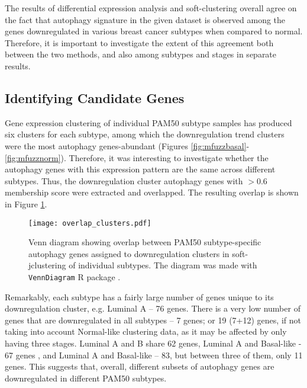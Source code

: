 The results of differential expression analysis and soft-clustering overall agree on the fact that autophagy signature in the given dataset is observed among the genes downregulated in various breast cancer subtypes when compared to normal. Therefore, it is important to investigate the extent of this agreement both between the two methods, and also among subtypes and stages in separate results. 



\subsection{Identifying Candidate Genes}

Gene expression clustering of individual PAM50 subtype samples has produced six clusters for each subtype, among which the downregulation trend clusters were the most autophagy genes-abundant (Figures \ref{fig:mfuzzbasal}-\ref{fig:mfuzznorm}). Therefore, it was interesting to investigate whether the autophagy genes with this expression pattern are the same across different subtypes. Thus, the downregulation cluster autophagy genes with $>0.6$ membership score were extracted and overlapped. The resulting overlap is shown in Figure \ref{fig:overlapclusters}. \\

            \begin{figure}[!h]
            \centering
            \texttt{[image: overlap\_clusters.pdf]} 
            \caption[Overlap between PAM50 subtype-specific downregulated autophagy genes]{Venn diagram showing overlap between PAM50 subtype-specific autophagy genes assigned to downregulation clusters in soft-jclustering of individual subtypes. The diagram was made with \texttt{VennDiagram} R package \cite{venndiagram}. }
            \label{fig:overlapclusters}
            \end{figure}
            
Remarkably, each subtype has a fairly large number of  genes unique to its downregulation cluster, e.g. Luminal A -- 76 genes. There is a very low number of genes that are downregulated in all subtypes -- 7 genes; or 19 (7+12) genes, if not taking into account Normal-like clustering data, as it may be affected by only having three stages. Luminal A and B share 62 genes, Luminal A and Basal-like - 67 genes , and Luminal A and Basal-like -- 83, but between three of them, only 11 genes. This suggests that, overall, different subsets of autophagy genes are downregulated in different PAM50 subtypes. 



